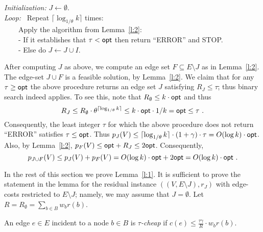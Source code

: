 \documentclass{llncs}
\begin{document}
\vspace{0.2cm}

\noindent
{\em Initialization:} $J \gets \emptyset$. \\
{\em Loop:} \ Repeat $\lceil \log_{1/\theta} k \rceil$ times: \\
\hphantom{Loop:} \ \ \ \ Apply the algorithm from Lemma~\ref{l:2}: \\ 
\hphantom{Loop:} \ \ \ \ - If it establishes that $\tau < {\sf opt}$ then return ``ERROR'' and STOP. \\
\hphantom{Loop:} \ \ \ \ - Else do $J \gets J \cup I$. 

\vspace{0.2cm}

After computing $J$ as above, we compute an edge set $F \subseteq E \setminus J$ as in Lemma~\ref{l:2}.
The edge-set $J \cup F$ is a feasible solution, by Lemma~\ref{l:2}.
We claim that for any $\tau \geq {\sf opt}$ the above procedure returns an edge 
set $J$ satisfying $R_J \leq \tau$; thus binary search indeed applies.
To see this, note that $R_\emptyset \leq k \cdot {\sf opt}$ and thus
$$R_J \leq R_\emptyset \cdot \theta^{\lceil \log_{1/\theta} k \rceil} \leq 
k \cdot {\sf opt} \cdot 1/k={\sf opt} \leq \tau \ .$$
Consequently, the least integer $\tau$ for which the above procedure does not return ``ERROR''
satisfies $\tau \leq {\sf opt}$. Thus
$p_J(V) \leq \lceil \log_{1/\theta} k \rceil \cdot (1+\gamma) \cdot \tau = O(\log k) \cdot {\sf opt}$.
Also, by Lemma~\ref{l:2}, $p_F(V) \leq {\sf opt}+R_J \leq 2{\sf opt}$. 
Consequently, 
$$p_{J \cup F}(V) \leq p_J(V)+p_F(V) =O(\log k) \cdot {\sf opt}+2{\sf opt} =O(\log k) \cdot {\sf opt} \ .$$

In the rest of this section we prove Lemma~\ref{l:1}. 
It is sufficient to prove the statement in the lemma for the residual 
instance $((V,E \setminus J),r_J)$ with edge-costs restricted to $E \setminus J$; 
namely, we may assume that $J=\emptyset$.
Let $R=R_\emptyset=\sum_{b \in B} w_b r(b)$.

\begin{definition}
An edge $e \in E$ incident to a node $b \in B$ is {\em $\tau$-cheap} if 
$c(e) \leq \frac{\tau\gamma}{R} \cdot w_b r(b)$.
\end{definition}
\end{document}
